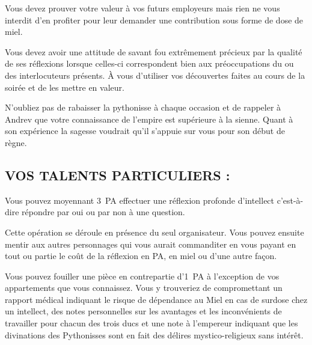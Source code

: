 \documentclass[14pt,twocolumn]{extarticle}
\begin{document}
Vous devez prouver votre valeur à vos futurs employeurs mais rien ne vous
interdit d'en profiter pour leur demander une contribution sous forme de dose
de miel.

Vous devez avoir une attitude de savant fou extrêmement précieux par la qualité
de ses réflexions lorsque celles-ci correspondent bien aux préoccupations du ou
des interlocuteurs présents. À vous d'utiliser vos découvertes faites au cours
de la soirée et de les mettre en valeur.

N'oubliez pas de rabaisser la pythonisse à chaque occasion et de rappeler à
Andrev que votre connaissance de l'empire est supérieure à la sienne. Quant à
son expérience la sagesse voudrait qu'il s'appuie sur vous pour son début de
règne.

\subsection{VOS TALENTS PARTICULIERS :}

Vous pouvez moyennant 3~PA effectuer une réflexion profonde d'intellect
c'est-à-dire répondre par oui ou par non à une question.

Cette opération se déroule en présence du seul organisateur. Vous pouvez
ensuite mentir aux autres personnages qui vous aurait commanditer en vous
payant en tout ou partie le coût de la réflexion en PA, en miel ou d'une autre
façon.

Vous pouvez fouiller une pièce en contrepartie d'1~PA à l'exception de vos
appartements que vous connaissez. Vous y trouveriez de compromettant un rapport
médical indiquant le risque de dépendance au Miel en cas de surdose chez un
intellect, des notes personnelles sur les avantages et les inconvénients de
travailler pour chacun des trois ducs et une note à l’empereur indiquant que
les divinations des Pythonisses sont en fait des délires mystico-religieux sans
intérêt.
\end{document}
